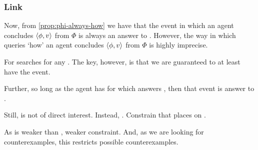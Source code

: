 \subsubsection{Link}
\label{cha:var:sec:vars:qhowv:sec:link}

\begin{note}
    Now, from \autoref{prop:phi-always-how} we have that the event in which an agent concludes \(\langle \phi, v \rangle\) from \(\Phi\) is always an answer to \qHowV{}.
  However, the way in which \qHowV{} queries `how' an agent concludes \(\langle \phi, v \rangle\) from \(\Phi\) is highly imprecise.

  For \qHowV{} searches for any \wit{}.
  The key, however, is that we are guaranteed to at least have the event.

  Further, so long as the agent has \wit{} for \ros{} which answers \qWhyV{}, then that event is answer to \qHowV{}.

  Still, \qHow{} is not of direct interest.
  Instead, \issueInclusion{}.
  Constrain that \qHow{} places on \qWhy{}.

  As \qHowV{} is weaker than \qHow{}, weaker constraint.
  And, as we are looking for counterexamples, this restricts possible counterexamples.
\end{note}

